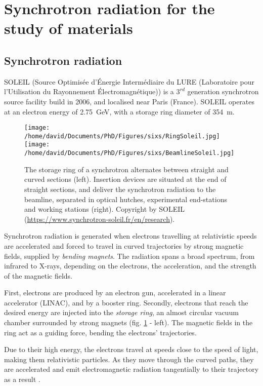 \section{Synchrotron radiation for the study of materials} \label{sec:SIXS}

\subsection{Synchrotron radiation}

SOLEIL (Source Optimisée d’Énergie Intermédiaire du LURE (Laboratoire pour l’Utilisation du Rayonnement Électromagnétique)) is a $3^{rd}$ generation synchrotron source facility build in 2006, and localised near Paris (France).
SOLEIL operates at an electron energy of \qty{2.75}{\GeV}, with a storage ring diameter of \qty{354}{\m}.

\begin{figure}[!htb]
    \centering
    \texttt{[image: /home/david/Documents/PhD/Figures/sixs/RingSoleil.jpg]}
    \texttt{[image: /home/david/Documents/PhD/Figures/sixs/BeamlineSoleil.jpg]}
    \caption{
    	The storage ring of a synchrotron alternates between straight and curved sections (left).
        Insertion devices are situated at the end of straight sections, and deliver the synchrotron radiation to the beamline, separated in optical hutches, experimental end-stations and working stations (right).
    	Copyright by SOLEIL (\url{https://www.synchrotron-soleil.fr/en/research}).
    }
    \label{fig:SOLEIL}
\end{figure}

Synchrotron radiation is generated when electrons travelling at relativistic speeds are accelerated and forced to travel in curved trajectories by strong magnetic fields, supplied by \textit{bending magnets}.
The radiation spans a broad spectrum, from infrared to X-rays, depending on the electrons, the acceleration, and the strength of the magnetic fields.

First, electrons are produced by an electron gun, accelerated in a linear accelerator (LINAC), and by a booster ring.
Secondly, electrons that reach the desired energy are injected into the \textit{storage ring}, an almost circular vacuum chamber surrounded by strong magnets (fig. \ref{fig:SOLEIL} - left).
The magnetic fields in the ring act as a guiding force, bending the electrons' trajectories.

Due to their high energy, the electrons travel at speeds close to the speed of light, making them relativistic particles.
As they move through the curved paths, they are accelerated and emit electromagnetic radiation tangentially to their trajectory as a result \parencite{Willmott, NielsenMcMorrow}.

